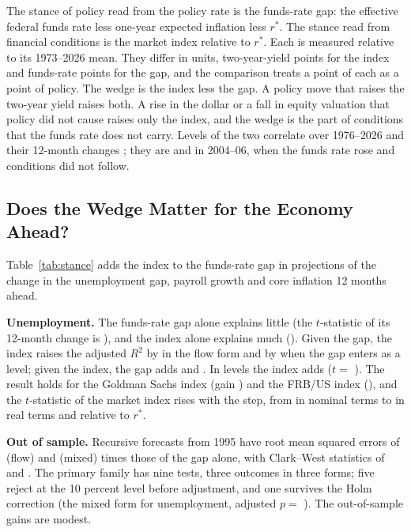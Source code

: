 \documentclass[11pt]{article}
\newcommand{\rs}{r^{*}}
\begin{document}
\begin{appendices}
The stance of policy read from the policy rate is the funds-rate gap: the effective federal funds rate less one-year expected inflation less $\rs$. The stance read from financial conditions is the market index relative to $\rs$. Each is measured relative to its 1973--2026 mean. They differ in units, two-year-yield points for the index and funds-rate points for the gap, and the comparison treats a point of each as a point of policy. The wedge is the index less the gap. A policy move that raises the two-year yield raises both. A rise in the dollar or a fall in equity valuation that policy did not cause raises only the index, and the wedge is the part of conditions that the funds rate does not carry. Levels of the two correlate  over 1976--2026 and their 12-month changes ; they are  and  in 2004--06, when the funds rate rose and conditions did not follow.

\subsection{Does the Wedge Matter for the Economy Ahead?}\label{sec:stancetest}
Table~\ref{tab:stance} adds the index to the funds-rate gap in projections of the change in the unemployment gap, payroll growth and core inflation 12 months ahead.



\textbf{Unemployment.} The funds-rate gap alone explains little (the $t$-statistic of its 12-month change is ), and the index alone explains much (). Given the gap, the index raises the adjusted $R^2$ by  in the flow form and by  when the gap enters as a level; given the index, the gap adds  and . In levels the index adds  ($t=$ ). The result holds for the Goldman Sachs index (gain ) and the FRB/US index (), and the $t$-statistic of the market index rises with the step, from  in nominal terms to  in real terms and  relative to $\rs$.

\textbf{Out of sample.} Recursive forecasts from 1995 have root mean squared errors of  (flow) and  (mixed) times those of the gap alone, with Clark--West statistics of  and . The primary family has nine tests, three outcomes in three forms; five reject at the 10 percent level before adjustment, and one survives the Holm correction (the mixed form for unemployment, adjusted $p=$ ). The out-of-sample gains are modest.


\end{appendices}
\end{document}
